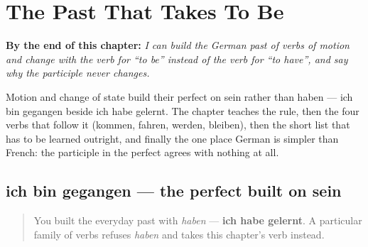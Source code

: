 
\chapter{The Past That Takes To Be}
\label{ch:ge-perfekt-sein}

\begin{chapteropening}
\textbf{By the end of this chapter:} \emph{I can build the German past of verbs of motion and change with the verb for “to be” instead of the verb for “to have”, and say why the participle never changes.}

Motion and change of state build their perfect on sein rather than haben — ich bin gegangen beside ich habe gelernt. The chapter teaches the rule, then the four verbs that follow it (kommen, fahren, werden, bleiben), then the short list that has to be learned outright, and finally the one place German is simpler than French: the participle in the perfect agrees with nothing at all.
\end{chapteropening}

\section[ich bin gegangen]{ich bin gegangen — the perfect built on sein}

\label{lesson:GE-C16-perfekt-sein}



\begin{quote}
You built the everyday past with \emph{haben} — \textbf{ich habe gelernt}. A particular family of verbs refuses \emph{haben} and takes this chapter's verb instead.
\end{quote}

